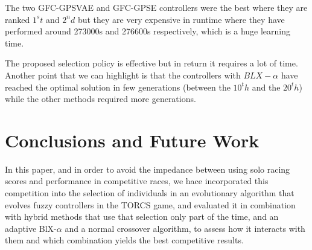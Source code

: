\documentclass[10pt,journal,compsoc]{IEEEtran}
\begin{document}
The two {\sf GFC-GPSVAE} and {\sf GFC-GPSE} controllers were the best where
they are ranked $1^st$ and $2^nd$ but they are very expensive in runtime
where they have performed around 273000s and 276600s respectively, which is a
huge learning time. %
                    
                 
The proposed selection policy is effective but in return it requires a
lot of time.%
%
Another point that we can highlight is that the controllers with
$BLX-\alpha$ have reached the optimal solution in few generations
(between the $10^th$ and the $20^th$) while the other methods required more
generations. 


\section{Conclusions and Future Work} 
\label{sec:conclusions}

In this paper, and in order to avoid the impedance between using solo
racing scores and performance in competitive races, we hace
incorporated this competition into the selection of individuals in an
evolutionary algorithm that evolves fuzzy controllers in the TORCS
game, and evaluated it in combination with hybrid methods that use
that selection only part of the time, and an adaptive BlX-$\alpha$ and
a normal crossover algorithm, to assess how it interacts with them and
which combination yields the best competitive results.

\end{document}
